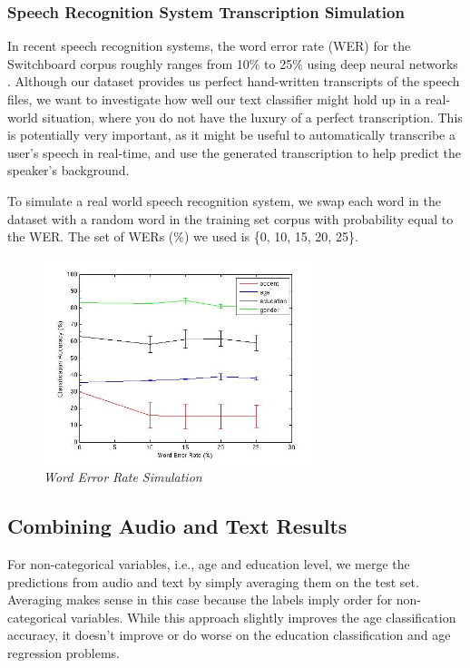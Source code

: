 \documentclass[a4paper]{article}
\begin{document}
\subsubsection{Speech Recognition System Transcription Simulation}

In recent speech recognition systems, the word error rate (WER) for the Switchboard corpus roughly ranges from 10\% to 25\% using deep neural networks \cite{maas}. Although our dataset provides us perfect hand-written transcripts of the speech files, we want to investigate how well our text classifier might hold up in a real-world situation, where you do not have the luxury of a perfect transcription. This is potentially very important, as it might be useful to automatically transcribe a user's speech in real-time, and use the generated transcription to help predict the speaker's background. 

To simulate a real world speech recognition system, we swap each word in the dataset with a random word in the training set corpus with probability equal to the WER. The set of WERs (\%) we used is \{0, 10, 15, 20, 25\}.

\begin{figure}[t]
\centerline{\includegraphics[width=80mm]{figures/wer.jpg}}
\caption{{\it Word Error Rate Simulation}}  
\label{wer}
\end{figure}

\subsection{Combining Audio and Text Results}
For non-categorical variables, i.e., age and education level, we merge the predictions from audio and text by simply averaging them on the test set. Averaging makes sense in this case because the labels imply order for non-categorical variables. While this approach slightly improves the age classification accuracy, it doesn't improve or do worse on the education classification and age regression problems.
\end{document}
